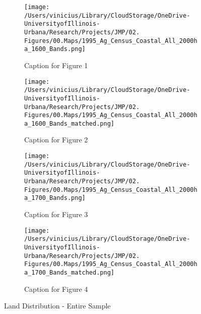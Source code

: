 \documentclass[11pt]{article}
\begin{document}
\begin{landscape}
  \begin{figure}[htbp]
    \centering
    \begin{subfigure}[b]{0.65\textwidth}
        \centering
        \texttt{[image: /Users/vinicius/Library/CloudStorage/OneDrive-UniversityofIllinois-Urbana/Research/Projects/JMP/02. Figures/00.Maps/1995\_Ag\_Census\_Coastal\_All\_2000ha\_1600\_Bands.png]}
        \caption{Caption for Figure 1}
        \label{fig:fig1}
    \end{subfigure}
    \hfill
    \begin{subfigure}[b]{0.65\textwidth}
        \centering
        \texttt{[image: /Users/vinicius/Library/CloudStorage/OneDrive-UniversityofIllinois-Urbana/Research/Projects/JMP/02. Figures/00.Maps/1995\_Ag\_Census\_Coastal\_All\_2000ha\_1600\_Bands\_matched.png]}
        \caption{Caption for Figure 2}
        \label{fig:fig2}
    \end{subfigure}

    \vspace{0.1cm} %

    \begin{subfigure}[b]{0.65\textwidth}
        \centering
        \texttt{[image: /Users/vinicius/Library/CloudStorage/OneDrive-UniversityofIllinois-Urbana/Research/Projects/JMP/02. Figures/00.Maps/1995\_Ag\_Census\_Coastal\_All\_2000ha\_1700\_Bands.png]}
        \caption{Caption for Figure 3}
        \label{fig:fig3}
    \end{subfigure}
    \hfill
    \begin{subfigure}[b]{0.65\textwidth}
        \centering
        \texttt{[image: /Users/vinicius/Library/CloudStorage/OneDrive-UniversityofIllinois-Urbana/Research/Projects/JMP/02. Figures/00.Maps/1995\_Ag\_Census\_Coastal\_All\_2000ha\_1700\_Bands\_matched.png]}
        \caption{Caption for Figure 4}
        \label{fig:fig4}
    \end{subfigure}

    \vspace{1cm}

    \caption{Land Distribution - Entire Sample}
    \label{fig:robustness_all_landsize_distance_cutoff}
    
\end{figure}
\end{landscape}

\clearpage
\end{document}
